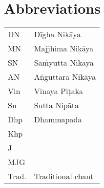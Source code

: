 \chapter*{Abbreviations}


\begin{tabular}{@{} l l @{}}
DN & Dīgha Nikāya \\
MN & Majjhima Nikāya \\
SN & Saṁyutta Nikāya \\
AN & Aṅguttara Nikāya \\
Vin & Vinaya Piṭaka \\
Sn & Sutta Nipāta \\
Dhp & Dhammapada \\
Khp & \\
J & \\
MJG & \\
Trad. & Traditional chant\\
\end{tabular}

%

